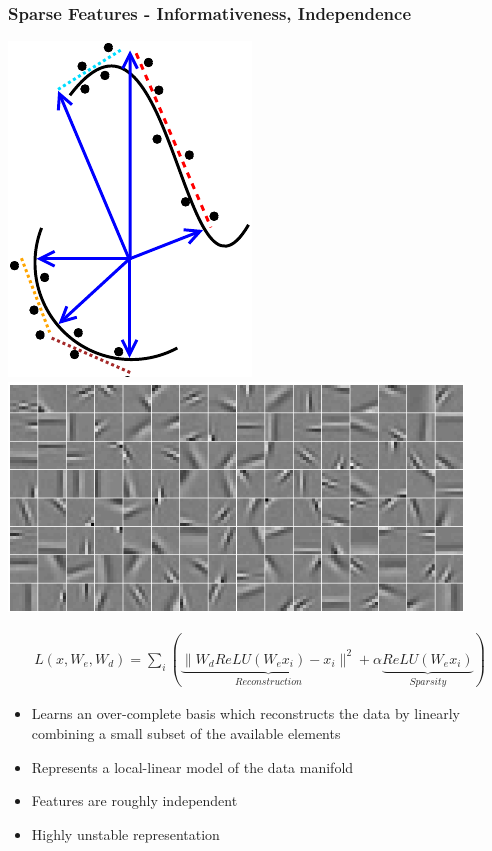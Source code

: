 \documentclass{beamer}
\begin{document}
\begin{frame} 
\frametitle{Sparse Features - Informativeness, Independence}
\begin{center} 
\includegraphics[scale=0.6]{./Figures/sparse2.pdf} \hspace{0.2cm}
\includegraphics[scale=0.30]{./Figures/sparse_filters.png}
\end{center} 
\begin{eqnarray}
\nonumber 
L(x,W_e,W_d)= \sum_{i} \left(\underbrace{\|W_d ReLU(W_e x_i) - x_i\|^2}_{Reconstruction} +  \alpha \underbrace{ReLU(W_e x_i)}_{Sparsity} \right)
\end{eqnarray}
\begin{itemize} 
\item{Learns an over-complete basis which reconstructs the data by linearly combining a small subset of the available elements}
\item{Represents a local-linear model of the data manifold}
\item{Features are roughly independent}
\item{Highly unstable representation}
\end{itemize} 
\end{frame} 
\end{document}
